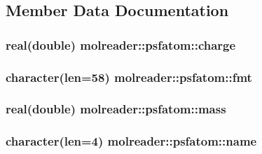 \subsection{Member Data Documentation}
\hypertarget{structmolreader_1_1psfatom_abbebc3b397af2ee56c04933bc3008753}{
\subsubsection[{charge}]{\setlength{\rightskip}{0pt plus 5cm}real(double) molreader\+::psfatom\+::charge\hspace{0.3cm}{\ttfamily [private]}}}\label{structmolreader_1_1psfatom_abbebc3b397af2ee56c04933bc3008753}
\hypertarget{structmolreader_1_1psfatom_a2c662eb006fdf85c624b28a08f65cc7b}{
\subsubsection[{fmt}]{\setlength{\rightskip}{0pt plus 5cm}character(len=58) molreader\+::psfatom\+::fmt\hspace{0.3cm}{\ttfamily [private]}}}\label{structmolreader_1_1psfatom_a2c662eb006fdf85c624b28a08f65cc7b}
\hypertarget{structmolreader_1_1psfatom_ae3774dcb1dec79eb1f7d5e26331056bb}{
\subsubsection[{mass}]{\setlength{\rightskip}{0pt plus 5cm}real(double) molreader\+::psfatom\+::mass\hspace{0.3cm}{\ttfamily [private]}}}\label{structmolreader_1_1psfatom_ae3774dcb1dec79eb1f7d5e26331056bb}
\hypertarget{structmolreader_1_1psfatom_a5f7ded307db07f842d21aee2dfca772b}{
\subsubsection[{name}]{\setlength{\rightskip}{0pt plus 5cm}character(len=4) molreader\+::psfatom\+::name\hspace{0.3cm}{\ttfamily [private]}}}\label{structmolreader_1_1psfatom_a5f7ded307db07f842d21aee2dfca772b}
